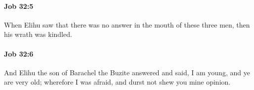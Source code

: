 		\paragraph{Job 32:5} %
			\label{JOB-32-5}

			When Elihu saw that there was no answer in the mouth of these three men, then his wrath was kindled.


		\paragraph{Job 32:6} %
			\label{JOB-32-6}

			And Elihu the son of Barachel the Buzite answered and said, I am young, and ye are very old; wherefore I was afraid, and durst not shew you mine opinion.


